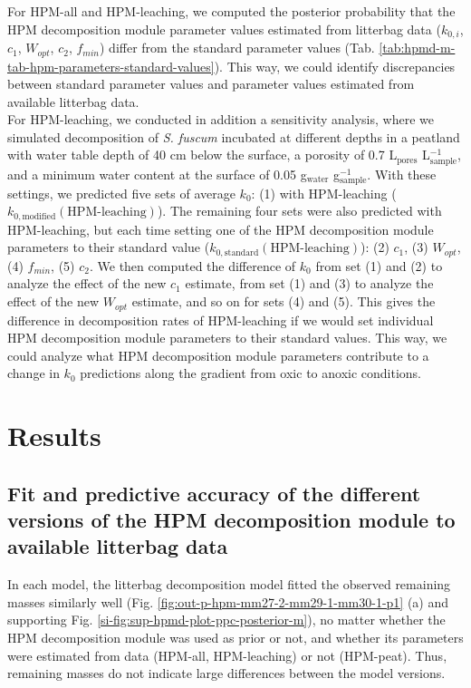 \documentclass[esd, manuscript]{copernicus}
\begin{document}
For HPM-all and HPM-leaching, we computed the posterior probability that the HPM decomposition module parameter values estimated from litterbag data (\(k_{0,i}\), \(c_1\), \(W_{opt}\), \(c_2\), \(f_{min}\)) differ from the standard parameter values (Tab. \ref{tab:hpmd-m-tab-hpm-parameters-standard-values}). This way, we could identify discrepancies between standard parameter values and parameter values estimated from available litterbag data.\\
For HPM-leaching, we conducted in addition a sensitivity analysis, where we simulated decomposition of \emph{S. fuscum} incubated at different depths in a peatland with water table depth of 40 cm below the surface, a porosity of 0.7 L\(_\text{pores}\) L\(_\text{sample}^{-1}\), and a minimum water content at the surface of 0.05 g\(_\text{water}\) g\(_\text{sample}^{-1}\). With these settings, we predicted five sets of average \(k_0\): (1) with HPM-leaching (\(k_{0,\text{modified}}(\text{HPM-leaching})\)). The remaining four sets were also predicted with HPM-leaching, but each time setting one of the HPM decomposition module parameters to their standard value (\(k_{0,\text{standard}}(\text{HPM-leaching})\)): (2) \(c_1\), (3) \(W_{opt}\), (4) \(f_{min}\), (5) \(c_2\). We then computed the difference of \(k_0\) from set (1) and (2) to analyze the effect of the new \(c_1\) estimate, from set (1) and (3) to analyze the effect of the new \(W_{opt}\) estimate, and so on for sets (4) and (5). This gives the difference in decomposition rates of HPM-leaching if we would set individual HPM decomposition module parameters to their standard values. This way, we could analyze what HPM decomposition module parameters contribute to a change in \(k_0\) predictions along the gradient from oxic to anoxic conditions.

\section{Results}

\subsection{Fit and predictive accuracy of the different versions of the HPM decomposition module to available litterbag data}

In each model, the litterbag decomposition model fitted the observed remaining masses similarly well (Fig. \ref{fig:out-p-hpm-mm27-2-mm29-1-mm30-1-p1} (a) and supporting Fig. \ref{si-fig:sup-hpmd-plot-ppc-posterior-m}), no matter whether the HPM decomposition module was used as prior or not, and whether its parameters were estimated from data (HPM-all, HPM-leaching) or not (HPM-peat). Thus, remaining masses do not indicate large differences between the model versions.
\end{document}
